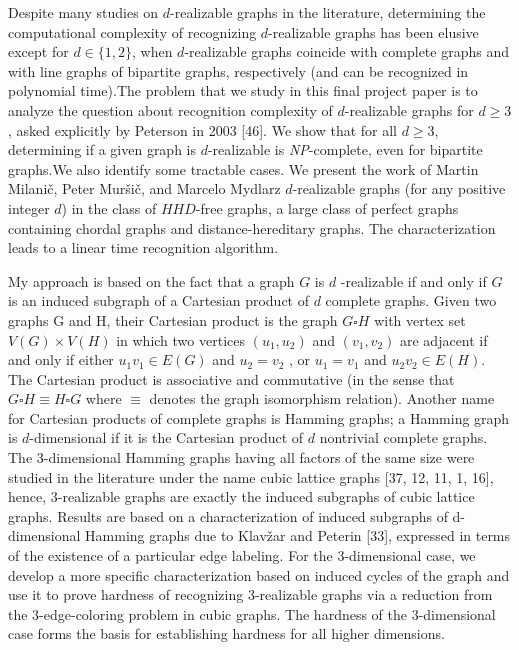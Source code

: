 \documentclass[12pt,a4paper,titlepage,openany]{report}
\begin{document}
Despite many studies on $d$-realizable graphs in the literature, determining the computational complexity of recognizing $d$-realizable graphs has been elusive except for $d \in \{1, 2\}$,
when $d$-realizable graphs coincide with complete graphs and with line graphs of bipartite graphs, respectively (and can be recognized in polynomial time).The problem that we study in this final project paper is to analyze the question about recognition complexity of $d$-realizable graphs for $d \geq 3$, asked explicitly by Peterson in 2003 [46].
We show that for all $d \geq 3$, determining if a given graph is $d$-realizable is {\it NP}-complete, even for bipartite graphs.We also identify some tractable cases.
We present the work of Martin Milani\v c, Peter Mur\v si\v c, and Marcelo Mydlarz $d$-realizable graphs (for any positive integer $d$) in the class of $HHD$-free graphs, a large class of perfect graphs containing chordal graphs and distance-hereditary graphs. The characterization leads to a linear time recognition algorithm.\newline

My approach is based on the fact that a graph $G$ is $d$ -realizable if and only if $G$ is an induced subgraph of a Cartesian product of $d$ complete graphs. Given two graphs G and H, their Cartesian product is the graph $G\square H$ with vertex set $V (G) \times V (H)$ in which two
vertices $(u_1 , u_2 )$ and $(v_1 , v_2 )$ are adjacent if and only if either $u_1 v_1\in E(G)$ and $u_2 = v_2$ ,
or $u_1 = v_1$ and $u_2 v_2 \in E(H)$. The Cartesian product is associative and commutative (in
the sense that $G\square H \equiv H\square G$ where $\equiv$ denotes the graph isomorphism relation). Another
name for Cartesian products of complete graphs is Hamming graphs; a Hamming graph is $d$-dimensional if it is the Cartesian product of $d$ nontrivial complete graphs. The 3-dimensional Hamming graphs having all factors of the same size were studied in the literature under the name cubic lattice graphs [37, 12, 11, 1, 16], hence, 3-realizable graphs are exactly the induced subgraphs of cubic lattice graphs. Results are based on a characterization of induced subgraphs of d-dimensional Hamming graphs due to Klav\v zar and Peterin [33], expressed in terms of the existence of a particular edge labeling. For the 3-dimensional case, we develop a more specific characterization based on induced cycles of the graph and use it to prove hardness of recognizing 3-realizable graphs via a reduction from the 3-edge-coloring problem
in cubic graphs. The hardness of the 3-dimensional case forms the basis for establishing hardness for all higher dimensions.\newline
\end{document}
